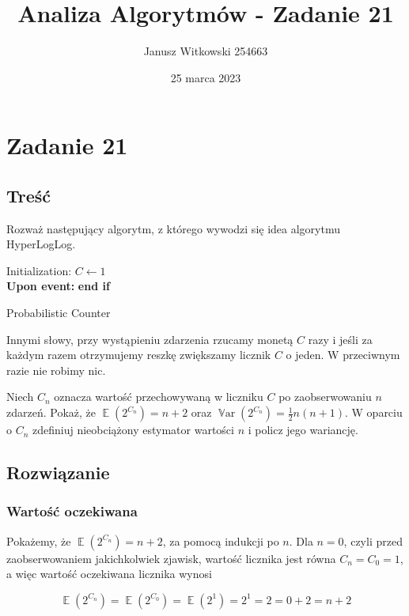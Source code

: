 \documentclass{article}
\title{Analiza Algorytmów - Zadanie 21}
\author{Janusz Witkowski 254663}
\date{25 marca 2023}
\newenvironment{pseudokod}[1][htb]{
	\renewcommand{\algorithmcfname}{}
	\begin{algorithm}[#1]%
	}{
\end{algorithm}
}
\DeclareMathOperator{\EX}{\mathbb{E}}%
\DeclareMathOperator{\Var}{\mathbb{V}ar}%
\begin{document}
    \maketitle
    

    \section{Zadanie 21}
    \subsection{Treść}
    Rozważ następujący algorytm, z którego wywodzi się idea algorytmu HyperLogLog.

    \begin{pseudokod}[H]
    Initialization: $C \leftarrow 1$\\
    \textbf{Upon event:}
    \textbf{end if}
    \caption{Probabilistic Counter}
    \end{pseudokod}

    Innymi słowy, przy wystąpieniu zdarzenia rzucamy monetą $C$ razy i jeśli za każdym razem otrzymujemy reszkę zwiększamy licznik $C$ o jeden. W przeciwnym razie nie robimy nic.

    Niech $C_n$ oznacza wartość przechowywaną w liczniku $C$ po zaobserwowaniu $n$ zdarzeń. Pokaż, że $\EX(2^{C_n}) = n + 2$ oraz $\Var(2^{C_n}) = \frac{1}{2}n(n+1)$. W oparciu o $C_n$ zdefiniuj nieobciążony estymator wartości $n$ i policz jego wariancję.

    \subsection{Rozwiązanie}
    \subsubsection{Wartość oczekiwana}
    Pokażemy, że $\EX(2^{C_n}) = n + 2$, za pomocą indukcji po $n$. Dla $n = 0$, czyli przed zaobserwowaniem jakichkolwiek zjawisk, wartość licznika jest równa $C_n = C_0 = 1$, a więc wartość oczekiwana licznika wynosi

    \begin{equation}
    \EX(2^{C_n}) = \EX(2^{C_0}) = \EX(2^1) = 2^1 = 2 = 0 + 2 = n + 2
    \end{equation}
\end{document}
